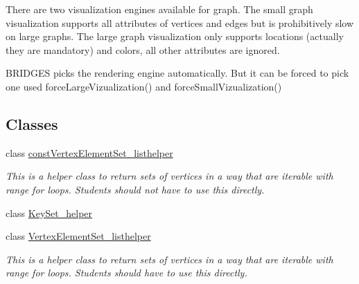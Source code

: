 There are two visualization engines available for graph. The small graph visualization supports all attributes of vertices and edges but is prohibitively slow on large graphs. The large graph visualization only supports locations (actually they are mandatory) and colors, all other attributes are ignored.

B\+R\+I\+D\+G\+ES picks the rendering engine automatically. But it can be forced to pick one used force\+Large\+Vizualization() and force\+Small\+Vizualization() \subsection*{Classes}
\begin{DoxyCompactItemize}
\item 
class \hyperlink{classbridges_1_1datastructure_1_1_graph_adj_list_1_1const_vertex_element_set__listhelper}{const\+Vertex\+Element\+Set\+\_\+listhelper}
\begin{DoxyCompactList}\small\item\em This is a helper class to return sets of vertices in a way that are iterable with range for loops. Students should not have to use this directly. \end{DoxyCompactList}\item 
class \hyperlink{classbridges_1_1datastructure_1_1_graph_adj_list_1_1_key_set__helper}{Key\+Set\+\_\+helper}
\item 
class \hyperlink{classbridges_1_1datastructure_1_1_graph_adj_list_1_1_vertex_element_set__listhelper}{Vertex\+Element\+Set\+\_\+listhelper}
\begin{DoxyCompactList}\small\item\em This is a helper class to return sets of vertices in a way that are iterable with range for loops. Students should have to use this directly. \end{DoxyCompactList}\end{DoxyCompactItemize}
